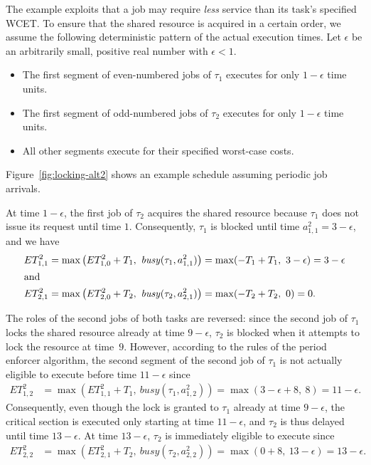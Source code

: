 The example exploits that a job may require \emph{less} service than its task's specified WCET. To ensure that the shared resource is acquired in a certain order, we assume the following deterministic pattern of the actual execution times. Let $\epsilon$ be an arbitrarily small, positive real number with $\epsilon <1$. 
\begin{itemize}
	\item The first segment of even-numbered jobs  of $\tau_1$ executes for only $1-\epsilon$ time units.
	\item The first segment of odd-numbered jobs of $\tau_2$ executes for only $1-\epsilon$ time units.
	\item All other segments execute for their specified worst-case costs.
\end{itemize}
Figure~\ref{fig:locking-alt2} shows an example schedule assuming periodic job arrivals.


At time $1-\epsilon$, the first job of $\tau_2$ acquires the shared resource because $\tau_1$ does not issue its request until time $1$. Consequently, $\tau_1$ is blocked until time $a^2_{1,1} = 3 - \epsilon$, and we have
\begin{align*}
	ET_{1,1}^2 & = \max\left(ET_{1,0}^2 + T_1,\ \mathit{busy}(\tau_1, a^2_{1,1})\right) =\max(-T_1 + T_1,\ 3 - \epsilon) = 3 - \epsilon
\\ \intertext{and}
	ET_{2,1}^2 & = \max\left(ET_{2,0}^2 + T_2,\ \mathit{busy}(\tau_2, a^2_{2,1})\right) =\max(-T_2 + T_2,\ 0) = 0.
\end{align*}

The roles of the second jobs of both tasks are reversed: since the second job of $\tau_1$ locks the shared resource already at time $9-\epsilon$, $\tau_2$ is blocked when it attempts to lock the resource at time~$9$. However, according to the rules of the period enforcer algorithm, the second segment of the second job of $\tau_1$ is not actually eligible to execute before time $11 - \epsilon$ since
\begin{align*}
	ET_{1,2}^2 & = \max\left(ET_{1,1}^2 + T_1,\ \mathit{busy}(\tau_1, a^2_{1,2})\right) =\max(3 - \epsilon + 8,\ 8) = 11 - \epsilon.
\end{align*}
Consequently, even though the lock is granted to $\tau_1$ already  at time $9-\epsilon$, the critical section is executed only starting at time $11 - \epsilon$, and $\tau_2$ is thus delayed until time $13 - \epsilon$. At time $13 - \epsilon$, $\tau_2$ is immediately eligible to execute since
\begin{align*}
	ET_{2,2}^2 & = \max\left(ET_{2,1}^2 + T_2,\ \mathit{busy}(\tau_2, a^2_{2,2})\right) =\max(0 + 8,\ 13 - \epsilon) = 13 - \epsilon.
\end{align*}

